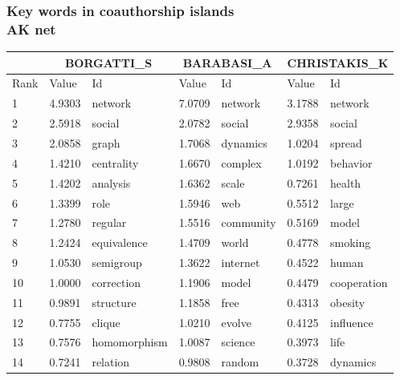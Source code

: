 \documentclass[hyperref={pdfstartview={FitBH -32768},
                         pdfpagemode=FullScreen,
                         plainpages=false,
                         colorlinks=true}
              ]{beamer}
\begin{document}
\begin{frame}[fragile]
\frametitle{Key words in coauthorship islands \\ \normalsize AK net }

\scriptsize
\renewcommand{\arraystretch}{0.84}
\begin{center}
\begin{tabular}{p{0.5cm}|p{0.8cm}|p{1.7cm}||p{0.8cm}|p{1.4cm}||p{0.8cm}|p{1.6cm}} \hline \hline
& \multicolumn{2}{c}{BORGATTI\_S}		& \multicolumn{2}{c}{BARABASI\_A}  & \multicolumn{2}{c}{CHRISTAKIS\_K}\\ \hline \hline
      Rank 	&   Value  & Id		    & 	   Value  & Id		       &	 Value  & Id	    \\ \hline
         1 	&  4.9303  & network	    &	    7.0709  & network	       &	  3.1788 &  network	    \\
         2 	&  2.5918  & social	    &	    2.0782  & social	       &	  2.9358 &  social	    \\
         3 	&  2.0858  & graph	    &	    1.7068  & dynamics	       &	  1.0204 &  spread	    \\
         4 	&  1.4210  & centrality	    &	    1.6670  & complex	       &	  1.0192 &  behavior	    \\
         5 	&  1.4202  & analysis	    &	    1.6362  & scale	       &	  0.7261 &  health	    \\
         6 	&  1.3399  & role	    &	    1.5946  & web	       &	  0.5512 &  large	    \\
         7 	&  1.2780  & regular	    &	    1.5516  & community	       &	  0.5169 &  model	    \\
         8 	&  1.2424  & equivalence    &	    1.4709  & world	       &	  0.4778 &  smoking	    \\
         9 	&  1.0530  & semigroup	    &	    1.3622  & internet	       &	  0.4522 &  human	    \\
        10 	&  1.0000  & correction	    &	    1.1906  & model	       &	  0.4479 &  cooperation	    \\
        11 	&  0.9891  & structure	    &	    1.1858  & free	       &	  0.4313 &  obesity	    \\
        12 	&  0.7755  & clique	    &	    1.0210  & evolve	       &	  0.4125 &  influence	    \\
        13 	&  0.7576  & homomorphism   &	    1.0087  & science	       &	  0.3973 &  life	    \\
        14 	&  0.7241  & relation	    &	    0.9808  & random	       &	  0.3728 &  dynamics	    \\

\end{tabular}
\end{center}
\end{frame}
\end{document}
